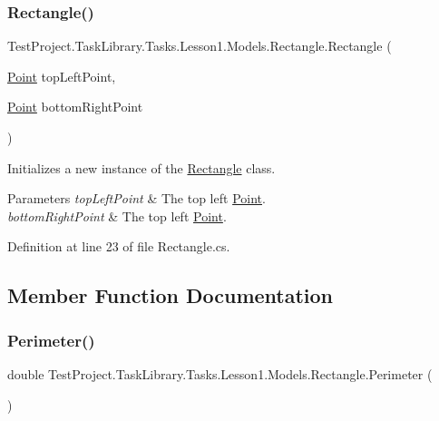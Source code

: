 \subsubsection{\texorpdfstring{Rectangle()}{Rectangle()}}
{\footnotesize\ttfamily Test\+Project.\+Task\+Library.\+Tasks.\+Lesson1.\+Models.\+Rectangle.\+Rectangle (\begin{DoxyParamCaption}\item[{\mbox{\hyperlink{class_test_project_1_1_task_library_1_1_tasks_1_1_lesson1_1_1_models_1_1_point}{Point}}}]{top\+Left\+Point,  }\item[{\mbox{\hyperlink{class_test_project_1_1_task_library_1_1_tasks_1_1_lesson1_1_1_models_1_1_point}{Point}}}]{bottom\+Right\+Point }\end{DoxyParamCaption})}



Initializes a new instance of the \mbox{\hyperlink{class_test_project_1_1_task_library_1_1_tasks_1_1_lesson1_1_1_models_1_1_rectangle}{Rectangle}} class. 


\begin{DoxyParams}{Parameters}
{\em top\+Left\+Point} & The top left \mbox{\hyperlink{class_test_project_1_1_task_library_1_1_tasks_1_1_lesson1_1_1_models_1_1_point}{Point}}.\\
\hline
{\em bottom\+Right\+Point} & The top left \mbox{\hyperlink{class_test_project_1_1_task_library_1_1_tasks_1_1_lesson1_1_1_models_1_1_point}{Point}}.\\
\hline
\end{DoxyParams}


Definition at line 23 of file Rectangle.\+cs.



\subsection{Member Function Documentation}
\mbox{\label{class_test_project_1_1_task_library_1_1_tasks_1_1_lesson1_1_1_models_1_1_rectangle_a4aee39825d6cb65cf5088becc58df3d0}} 
\subsubsection{\texorpdfstring{Perimeter()}{Perimeter()}}
{\footnotesize\ttfamily double Test\+Project.\+Task\+Library.\+Tasks.\+Lesson1.\+Models.\+Rectangle.\+Perimeter (\begin{DoxyParamCaption}{ }\end{DoxyParamCaption})}



